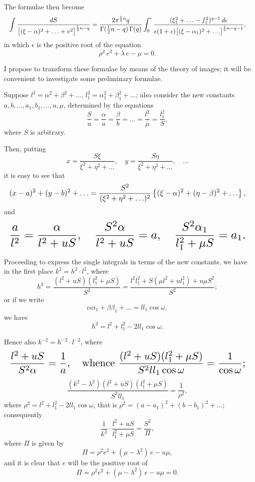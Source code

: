 \documentclass[11pt,a4paper]{article}
\theoremstyle{plain}
\begin{document}
The formulae then become
\[
\resizebox{\textwidth}{!}{$\displaystyle \int \frac{dS}{\bigl[(\xi-\alpha)^2 + \ldots + v^2\bigr]^{\frac{1}{2}n-q}} = \frac{2\pi^{\frac{1}{2}n}q}{\Gamma(\tfrac{1}{2}n-q)\,\Gamma(q)} \int_0^{\epsilon} \frac{(\xi_1^2 + \ldots - f_1^2)^{q-1}\,d\epsilon}{\epsilon(1+\epsilon)\bigl[(\xi-\alpha_1)^2 + \ldots\bigr]^{\frac{1}{2}n-q-1}}, $}
\]
in which $\epsilon$ is the positive root of the equation
\[\rho^2\,e^2 + \lambda\,e - \mu = 0.\]

I propose to transform these formulae by means of the theory of images; it will be convenient to investigate some preliminary formulae.

Suppose $l^2 = \alpha^2 + \beta^2 + \ldots$, $l_1^2 = \alpha_1^2 + \beta_1^2 + \ldots$; also consider the new constants $a, b, \ldots, a_1, b_1, \ldots, u, \mu$, determined by the equations
\[\frac{S}{u} = \frac{\alpha}{a} = \frac{\beta}{b} = \ldots = \frac{l^2}{\mu} = \frac{l_1^2}{S},\]
where $S$ is arbitrary.

Then, putting
\[x = \frac{S\xi}{\xi^2 + \eta^2 + \ldots}, \quad y = \frac{S\eta}{\xi^2 + \eta^2 + \ldots}, \quad \ldots\]
it is easy to see that
\[
\resizebox{\textwidth}{!}{$\displaystyle (x-a)^2 + (y-b)^2 + \ldots = \frac{S^2}{(\xi^2 + \eta^2 + \ldots)^2}\left\{(\xi-\alpha)^2 + (\eta-\beta)^2 + \ldots\right\}, $}
\]
and
\[
\resizebox{\textwidth}{!}{$\displaystyle \frac{a}{l^2} = \frac{\alpha}{l^2 + uS}, \quad \frac{S^2\alpha}{l^2 + uS} = a, \quad \frac{S^2\alpha_1}{l_1^2 + \mu S} = a_1. $}
\]

Proceeding to express the single integrals in terms of the new constants, we have in the first place $k^2 = h^2 \cdot l^2$, where
\[h^2 = \frac{(l^2 + uS)(l_1^2 + \mu S)}{S^2} = \frac{l^2 l_1^2 + S(\mu l^2 + u l_1^2) + u\mu S^2}{S^2};\]
or if we write
\[\alpha\alpha_1 + \beta\beta_1 + \ldots = l l_1 \cos \omega,\]
we have
\[h^2 = l^2 + l_1^2 - 2 l l_1 \cos\omega.\]

Hence also $k^{-2} = h^{-2}\cdot l^{-2}$, where
\[
\resizebox{\textwidth}{!}{$\displaystyle \frac{l^2 + u S}{S^2 \alpha} = \frac{1}{a}, \quad \text{whence } \frac{(l^2 + uS)(l_1^2 + \mu S)}{S^2 l l_1 \cos\omega} = \frac{1}{\cos\omega}; $}
\]
\[\frac{(k^2 - \lambda^2)(l^2 + u S)(l_1^2 + \mu S)}{S^2 l l_1} = \frac{1}{\rho^2},\]
where $\rho^2 = l^2 + l_1^2 - 2 l l_1 \cos\omega$, that is $\rho^2 = (a-a_1)^2 + (b-b_1)^2 + \ldots$; consequently
\[\frac{1}{k^2}\cdot\frac{l^2 + u S}{l_1^2 + \mu S} = \frac{S^2}{\Pi},\]
where $\Pi$ is given by
\[\Pi = \rho^2 e^2 + (\mu - \lambda^2)\,e - u\mu,\]
and it is clear that $e$ will be the positive root of
\[\Pi = \rho^2 e^2 + (\mu - \lambda^2)\,e - u\mu = 0.\]
\end{document}
